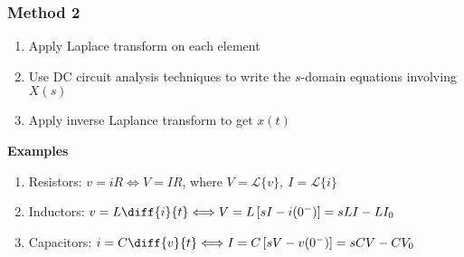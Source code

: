 \documentclass[a4paper,11pt]{article}
\begin{document}
	\subsubsection{Method 2}
	\begin{enumerate}
		\item Apply Laplace transform on each element
		\item Use DC circuit analysis techniques to write the $s$-domain equations involving $X(s)$
		\item Apply inverse Laplance transform to get $x(t)$
	\end{enumerate}
	
	\textbf{Examples}
	\begin{enumerate}
		\item Resistors: $v = iR \Longleftrightarrow V = IR$, where $V = \mathcal{L}\{v\},~I = \mathcal{L}\{i\}$
		\item Inductors: $v = L\diff{i}{t} \Longleftrightarrow V = L\left[sI - i(0^-)\right] = sLI - LI_0$
		\item Capacitors: $i = C\diff{v}{t} \Longleftrightarrow I = C\left[sV - v(0^-)\right] = sCV - CV_0$ 
	\end{enumerate}
\end{document}
